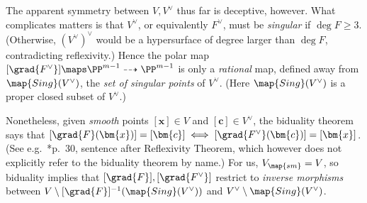 \documentclass[12pt]{report}
\begin{document}
The apparent symmetry between $V,V^\vee$ thus far is deceptive, however.
What complicates matters is that $V^\vee$, or equivalently $F^\vee$,
must be \emph{singular} if $\deg{F}\geq 3$.
(Otherwise,
$(V^\vee)^\vee$ would be a hypersurface of degree larger than $\deg{F}$,
contradicting reflexivity.)
Hence the polar map $[\grad{F^\vee}]\maps\PP^{m-1}\dashrightarrow\PP^{m-1}$ is only a \emph{rational} map,
defined away from $\map{Sing}(V^\vee)$, the \emph{set of singular points} of $V^\vee$.
(Here $\map{Sing}(V^\vee)$ is a proper closed subset of $V^\vee$.)

Nonetheless,
given \emph{smooth} points $[\bm{x}]\in V$ and $[\bm{c}]\in V^\vee$,
the biduality theorem says that
$[\grad{F}(\bm{x})] = [\bm{c}]\iff[\grad{F^\vee}(\bm{c})] = [\bm{x}]$.
(See e.g.~\cite{dolgachev2012classical}*{p.~30, sentence after Reflexivity Theorem},
which however does not explicitly refer to the biduality theorem by name.)
For us,
$V_{\map{sm}}=V$,
so biduality implies that $[\grad{F}],[\grad{F^\vee}]$ restrict to
\emph{inverse morphisms} between $V\setminus[\grad{F}]^{-1}(\map{Sing}(V^\vee))$ and $V^\vee\setminus\map{Sing}(V^\vee)$.

\end{document}
